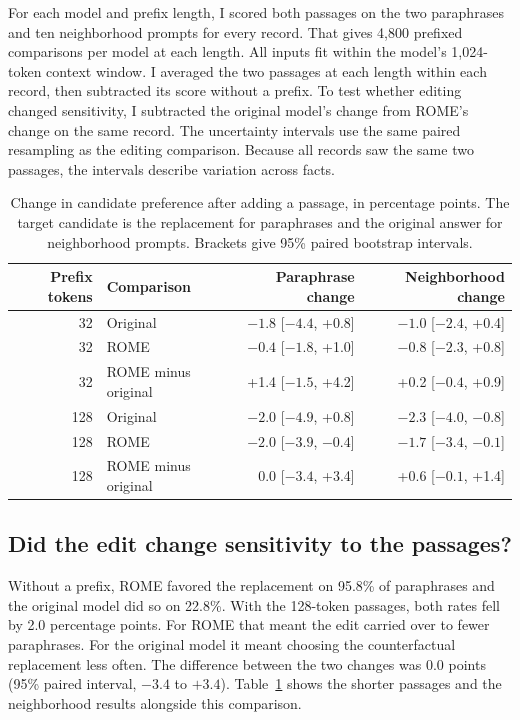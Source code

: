 \documentclass[11pt]{article}
\begin{document}
For each model and prefix length, I scored both passages on the two paraphrases and ten neighborhood prompts for every record. That gives 4,800 prefixed comparisons per model at each length. All inputs fit within the model's 1,024-token context window. I averaged the two passages at each length within each record, then subtracted its score without a prefix. To test whether editing changed sensitivity, I subtracted the original model's change from ROME's change on the same record. The uncertainty intervals use the same paired resampling as the editing comparison. Because all records saw the same two passages, the intervals describe variation across facts.

\begin{table}[t]\centering\small\begin{tabular}{rlrr}\toprule
Prefix tokens & Comparison & Paraphrase change & Neighborhood change\\\midrule
32 & Original & $-1.8$ [$-4.4$, +0.8] & $-1.0$ [$-2.4$, +0.4] \\
32 & ROME & $-0.4$ [$-1.8$, +1.0] & $-0.8$ [$-2.3$, +0.8] \\
32 & ROME minus original & +1.4 [$-1.5$, +4.2] & +0.2 [$-0.4$, +0.9] \\
128 & Original & $-2.0$ [$-4.9$, +0.8] & $-2.3$ [$-4.0$, $-0.8$] \\
128 & ROME & $-2.0$ [$-3.9$, $-0.4$] & $-1.7$ [$-3.4$, $-0.1$] \\
128 & ROME minus original & 0.0 [$-3.4$, +3.4] & +0.6 [$-0.1$, +1.4] \\
\bottomrule\end{tabular}\caption{Change in candidate preference after adding a passage, in percentage points. The target candidate is the replacement for paraphrases and the original answer for neighborhood prompts. Brackets give 95\% paired bootstrap intervals.}\label{tab:prefix}
\end{table}

\subsection{Did the edit change sensitivity to the passages?}
Without a prefix, ROME favored the replacement on 95.8\% of paraphrases and the original model did so on 22.8\%. With the 128-token passages, both rates fell by 2.0 percentage points. For ROME that meant the edit carried over to fewer paraphrases. For the original model it meant choosing the counterfactual replacement less often. The difference between the two changes was 0.0 points (95\% paired interval, $-3.4$ to $+3.4$). Table~\ref{tab:prefix} shows the shorter passages and the neighborhood results alongside this comparison.
\end{document}
